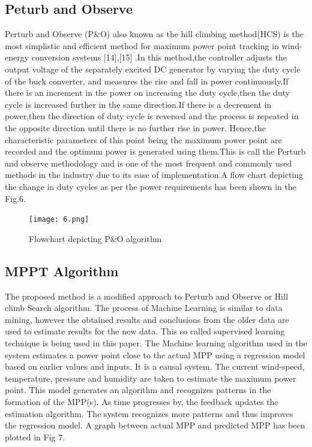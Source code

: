 \subsection{Peturb and Observe}
Perturb and Observe (P\&O) also known as the hill climbing method(HCS) is the most simplistic and efficient method for maximum power point tracking in wind-energy conversion systems [14],[15] .In this method,the controller adjusts the output voltage of the separately excited DC generator by varying the duty cycle of the buck converter, and measures the rise and fall in power continuously.If there is an increment in the power on increasing the duty cycle,then the duty cycle is increased further in the same direction.If there is a decrement in power,then the direction of duty cycle is reversed and the process is repeated in the opposite direction until there is no further rise in power. Hence,the characteristic parameters of this point being the maximum power point are recorded and the optimum power is generated using them.This is call the Perturb and observe methodology and is one of the most frequent and commonly used methods in the industry due to its ease of implementation.A flow chart depicting the change in duty cycles as per the power requirements has been shown in the Fig.6.

\begin{center}
\begin{figure}
\texttt{[image: 6.png]}
\caption{Flowchart depicting P\&O algorithm}
\label{Fig.6}    
\end{figure}
\end{center}

\subsection{MPPT Algorithm}
The proposed method is a modified approach to Perturb and Observe or Hill climb Search algorithm. The process of Machine Learning is similar to data mining, however the obtained results and conclusions from the older data are used to estimate results for the new data. This so called supervised learning technique is being used in this paper. The Machine learning algorithm  used in the system estimates a power point close to the actual MPP using a regression model based on earlier values and inputs. It is a causal system. The current wind-speed, temperature, pressure and humidity are taken to estimate the maximum power point. This model generates an algorithm and recognizes patterns in the formation of the MPP(s). As time progresses by, the feedback updates the estimation algorithm. The system recognizes more patterns and thus improves the regression model. A graph between actual MPP and predicted MPP has been plotted in Fig 7.

